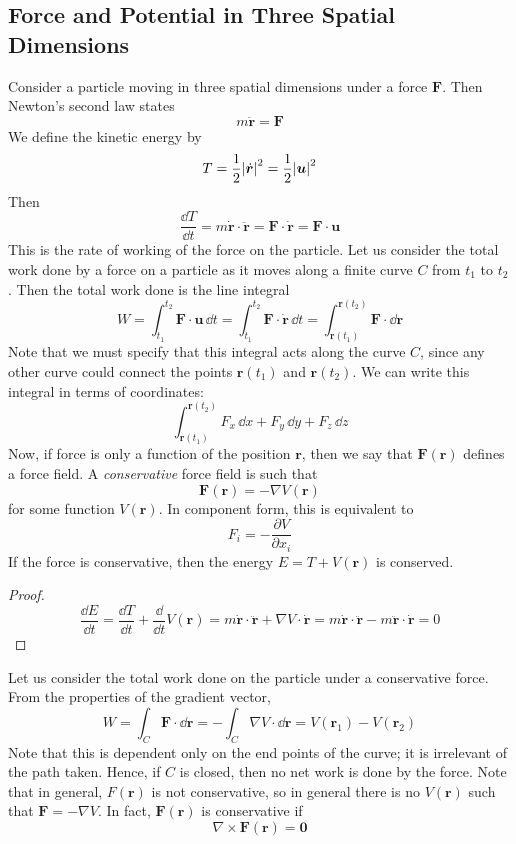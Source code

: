 \documentclass{article}
\begin{document}
\subsection{Force and Potential in Three Spatial Dimensions}
Consider a particle moving in three spatial dimensions under a force $\bm F$. Then Newton's second law states
\[ m \ddot {\bm r} = \bm F \]
We define the kinetic energy by
\[ T = \frac{1}{2}\abs{\dot {\bm r}}^2 = \frac{1}{2}\abs{\bm u}^2 \]
Then
\[ \frac{\dd T}{\dd t} = m \dot {\bm r} \cdot \ddot {\bm r} = \bm F \cdot \dot{\bm r} = \bm F \cdot \bm u \]
This is the rate of working of the force on the particle. Let us consider the total work done by a force on a particle as it moves along a finite curve $C$ from $t_1$ to $t_2$. Then the total work done is the line integral
\[
    W = \int_{t_1}^{t_2} \bm F \cdot \bm u \,\dd t
    = \int_{t_1}^{t_2} \bm F \cdot \dot {\bm r} \,\dd t
    = \int_{\bm r(t_1)}^{\bm r(t_2)} \bm F \cdot \dd \bm r
\]
Note that we must specify that this integral acts along the curve $C$, since any other curve could connect the points $\bm r(t_1)$ and $\bm r(t_2)$. We can write this integral in terms of coordinates:
\[ \int_{\bm r(t_1)}^{\bm r(t_2)} F_x \,\dd x + F_y \,\dd y + F_z \,\dd z \]
Now, if force is only a function of the position $\bm r$, then we say that $\bm F(\bm r)$ defines a force field. A \textit{conservative} force field is such that
\[ \bm F(\bm r) = -\nabla V(\bm r) \]
for some function $V(\bm r)$. In component form, this is equivalent to
\[ F_i = -\frac{\partial V}{\partial x_i} \]
If the force is conservative, then the energy $E = T + V(\bm r)$ is conserved.
\begin{proof}
    \[ \frac{\dd E}{\dd t} = \frac{\dd T}{\dd t} + \frac{\dd}{\dd t}V(\bm r) = m \dot{\bm r} \cdot \ddot{\bm r} + \nabla V \cdot \dot{\bm r} = m\dot{\bm r} \cdot \ddot{\bm r} - m\ddot{\bm r} \cdot \dot{\bm r} = 0 \]
\end{proof}
\noindent Let us consider the total work done on the particle under a conservative force. From the properties of the gradient vector,
\[ W = \int_C \bm F \cdot \dd \bm r = -\int_C \nabla V \cdot \dd \bm r = V(\bm r_1) - V(\bm r_2) \]
Note that this is dependent only on the end points of the curve; it is irrelevant of the path taken. Hence, if $C$ is closed, then no net work is done by the force. Note that in general, $F(\bm r)$ is not conservative, so in general there is no $V(\bm r)$ such that $\bm F = -\nabla V$. In fact, $\bm F(\bm r)$ is conservative if
\[ \nabla \times \bm F(\bm r) = \bm 0 \]
\end{document}
